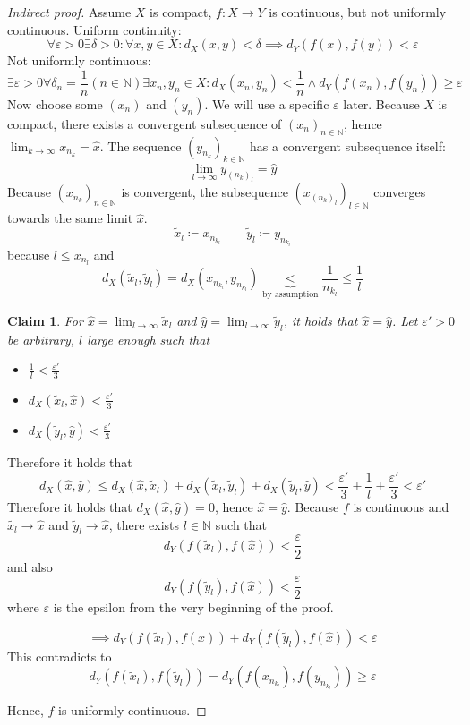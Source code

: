 \documentclass{article}
\newtheorem*{claim}{Claim}%
\begin{document}
\begin{proof}[Indirect proof]
  Assume $X$ is compact, $f: X \to Y$ is continuous, but not uniformly continuous. Uniform continuity:
  \[ \forall \varepsilon > 0 \exists \delta > 0: \forall x, y \in X: d_X(x,y) < \delta \implies d_Y(f(x), f(y)) < \varepsilon \]
  Not uniformly continuous:
  \[ \exists \varepsilon > 0 \forall \delta_n = \frac1n (n \in \mathbb N) \exists x_n, y_n \in X: d_X(x_n, y_n) < \frac1n \land d_Y(f(x_n), f(y_n)) \geq \varepsilon \]
  Now choose some $(x_n)$ and $(y_n)$. We will use a specific $\varepsilon$ later.
  Because $X$ is compact, there exists a convergent subsequence of $(x_n)_{n \in \mathbb N}$, hence $\lim_{k\to\infty} x_{n_k} = \hat{x}$.
  The sequence $(y_{n_k})_{k \in \mathbb N}$ has a convergent subsequence itself:
  \[ \lim_{l\to\infty} y_{(n_k)_l} = \hat{y} \]
  Because $(x_{n_k})_{n \in \mathbb N}$ is convergent, the subsequence $(x_{(n_k)_l})_{l \in \mathbb N}$ converges towards the same limit $\hat{x}$.
  \[ \tilde{x}_l \coloneqq x_{n_{k_l}} \qquad \tilde{y}_l \coloneqq y_{n_{k_l}} \]
  because $l \leq x_{n_l}$ and
  \[ d_X(\tilde{x}_l, \tilde{y}_l) = d_X(x_{n_{k_l}}, y_{n_{k_l}}) \underbrace{<}_{\text{by assumption}} \frac{1}{n_{k_l}} \leq \frac1l \]

  \begin{claim}
    For $\hat{x} = \lim_{l\to\infty} \tilde{x}_l$ and $\hat{y} = \lim_{l\to\infty} \tilde{y}_l$, it holds that $\hat{x} = \hat{y}$.
    Let $\varepsilon' > 0$ be arbitrary, $l$ large enough such that
    \begin{itemize}
      \item $\frac1l < \frac{\varepsilon'}{3}$
      \item $d_X(\tilde{x}_l, \hat{x}) < \frac{\varepsilon'}{3}$
      \item $d_X(\tilde{y}_l, \hat{y}) < \frac{\varepsilon'}{3}$
    \end{itemize}
  \end{claim}
  Therefore it holds that
  \[
    d_X(\hat x, \hat y) \leq d_X(\hat x, \tilde x_l) + d_X(\tilde x_l, \tilde y_l) + d_X(\tilde y_l, \hat y)
    < \frac{\varepsilon'}{3} + \frac1l + \frac{\varepsilon'}{3} < \varepsilon'
  \]
  Therefore it holds that $d_X(\hat{x}, \hat{y}) = 0$, hence $\hat{x} = \hat{y}$.
  Because $f$ is continuous and $\tilde{x_l} \to \hat{x}$ and $\tilde{y}_l \to \hat{x}$, there exists $l \in \mathbb N$ such that
  \[ d_Y(f(\tilde x_l), f(\hat{x})) < \frac\varepsilon2 \]
  and also
  \[ d_Y(f(\tilde y_l), f(\hat{x})) < \frac\varepsilon2 \]
  where $\varepsilon$ is the epsilon from the very beginning of the proof.

  \[ \implies d_Y(f(\tilde x_l), f(\hat{x})) + d_Y(f(\tilde y_l), f(\hat{x})) < \varepsilon \]
  This contradicts to
  \[ d_Y(f(\tilde{x}_l), f(\tilde{y}_l)) = d_Y(f(x_{n_{k_l}}), f(y_{n_{k_l}})) \geq \varepsilon \]

  Hence, $f$ is uniformly continuous.
\end{proof}
\end{document}

